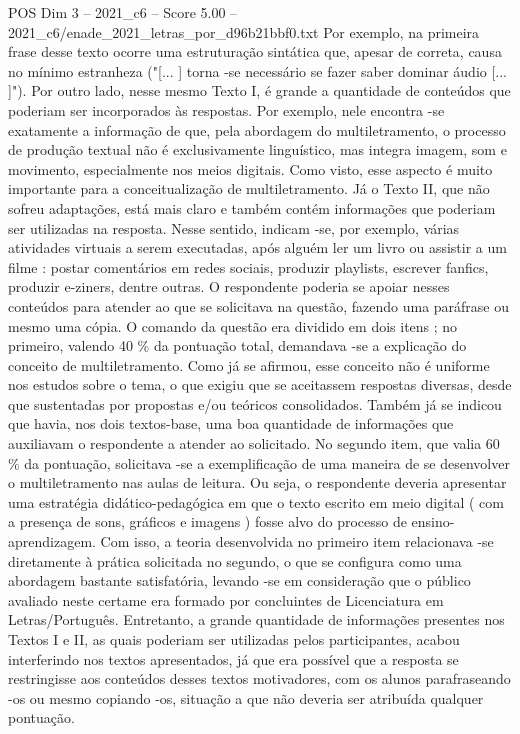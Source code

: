 \begin{textsample}{POS Dim 3 – 2021\_c6 – Score 5.00 – 2021\_c6/enade\_2021\_letras\_por\_d96b21bbf0.txt}
Por exemplo, na primeira frase desse texto ocorre uma estruturação sintática que, apesar de correta, causa no mínimo estranheza ("[... ] torna -se necessário se fazer saber dominar áudio [... ]").
Por outro lado, nesse mesmo Texto I, é grande a quantidade de conteúdos que poderiam ser incorporados às respostas.
Por exemplo, nele encontra -se exatamente a informação de que, pela abordagem do multiletramento, o processo de produção textual não é exclusivamente linguístico, mas integra imagem, som e movimento, especialmente nos meios digitais.
Como visto, esse aspecto é muito importante para a conceitualização de multiletramento.
Já o Texto II, que não sofreu adaptações, está mais claro e também contém informações que poderiam ser utilizadas na resposta.
Nesse sentido, indicam -se, por exemplo, várias atividades virtuais a serem executadas, após alguém ler um livro ou assistir a um filme : postar comentários em redes sociais, produzir playlists, escrever fanfics, produzir e-ziners, dentre outras.
O respondente poderia se apoiar nesses conteúdos para atender ao que se solicitava na questão, fazendo uma paráfrase ou mesmo uma cópia.
O comando da questão era dividido em dois itens ; no primeiro, valendo 40 \% da pontuação total, demandava -se a explicação do conceito de multiletramento.
Como já se afirmou, esse conceito não é uniforme nos estudos sobre o tema, o que exigiu que se aceitassem respostas diversas, desde que sustentadas por propostas e/ou teóricos consolidados.
Também já se indicou que havia, nos dois textos-base, uma boa quantidade de informações que auxiliavam o respondente a atender ao solicitado.
No segundo item, que valia 60 \% da pontuação, solicitava -se a exemplificação de uma maneira de se desenvolver o multiletramento nas aulas de leitura.
Ou seja, o respondente deveria apresentar uma estratégia didático-pedagógica em que o texto escrito em meio digital ( com a presença de sons, gráficos e imagens ) fosse alvo do processo de ensino-aprendizagem.
Com isso, a teoria desenvolvida no primeiro item relacionava -se diretamente à prática solicitada no segundo, o que se configura como uma abordagem bastante satisfatória, levando -se em consideração que o público avaliado neste certame era formado por concluintes de Licenciatura em Letras/Português.
Entretanto, a grande quantidade de informações presentes nos Textos I e II, as quais poderiam ser utilizadas pelos participantes, acabou interferindo nos textos apresentados, já que era possível que a resposta se restringisse aos conteúdos desses textos motivadores, com os alunos parafraseando -os ou mesmo copiando -os, situação a que não deveria ser atribuída qualquer pontuação.

\end{textsample}
